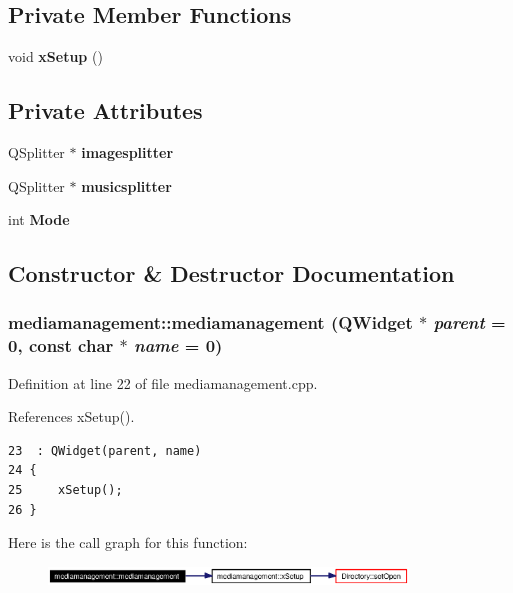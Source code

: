 \subsection*{Private Member Functions}
\begin{CompactItemize}
\item 
void {\bf x\-Setup} ()
\end{CompactItemize}
\subsection*{Private Attributes}
\begin{CompactItemize}
\item 
QSplitter $\ast$ {\bf imagesplitter}
\item 
QSplitter $\ast$ {\bf musicsplitter}
\item 
int {\bf Mode}
\end{CompactItemize}


\subsection{Constructor \& Destructor Documentation}
\subsubsection{\setlength{\rightskip}{0pt plus 5cm}mediamanagement::mediamanagement ({\bf QWidget} $\ast$ {\em parent} = 0, const char $\ast$ {\em name} = 0)}\label{classmediamanagement_mediamanagementa0}




Definition at line 22 of file mediamanagement.cpp.

References x\-Setup().



\footnotesize\begin{verbatim}23  : QWidget(parent, name)
24 {
25     xSetup();
26 }
\end{verbatim}\normalsize 


Here is the call graph for this function:\begin{figure}[H]
\begin{center}
\leavevmode
\includegraphics[width=271pt]{classmediamanagement_mediamanagementa0_cgraph}
\end{center}
\end{figure}
